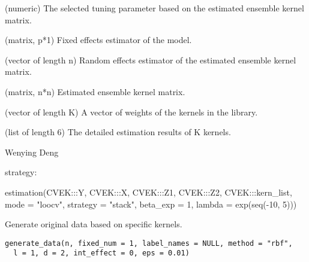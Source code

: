 \documentclass[a4paper]{book}
\begin{document}
%
\begin{Value}
\begin{ldescription}
\item[\code{lambda}] (numeric) The selected tuning parameter based on the
estimated ensemble kernel matrix.

\item[\code{beta}] (matrix, p*1) Fixed effects estimator of the model.

\item[\code{alpha}] (vector of length n) Random effects estimator of the estimated
ensemble kernel matrix.

\item[\code{K}] (matrix, n*n) Estimated ensemble kernel matrix.

\item[\code{u\_hat}] (vector of length K) A vector of weights of the kernels in the
library.

\item[\code{base\_est}] (list of length 6) The detailed estimation results of K
kernels.
\end{ldescription}
\end{Value}
%
\begin{Author}\relax
Wenying Deng
\end{Author}
%
\begin{SeeAlso}\relax
strategy: 
\end{SeeAlso}
%
\begin{Examples}
\begin{ExampleCode}



estimation(CVEK:::Y, CVEK:::X, CVEK:::Z1, CVEK:::Z2, CVEK:::kern_list, 
mode = "loocv", strategy = "stack", beta_exp = 1, lambda = exp(seq(-10, 5)))



\end{ExampleCode}
\end{Examples}
%
\begin{Description}\relax
Generate original data based on specific kernels.
\end{Description}
%
\begin{Usage}
\begin{verbatim}
generate_data(n, fixed_num = 1, label_names = NULL, method = "rbf",
  l = 1, d = 2, int_effect = 0, eps = 0.01)
\end{verbatim}
\end{Usage}
\end{document}
